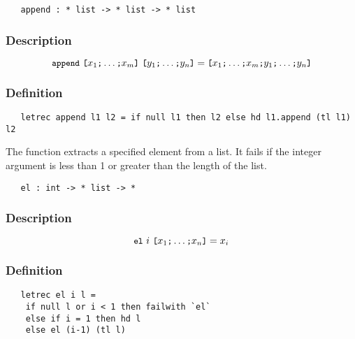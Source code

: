 \begin{boxed}
\begin{verbatim}
   append : * list -> * list -> * list
\end{verbatim}\end{boxed}

\subsubsection*{Description}

\[ \ml{append}\ \ml{[}x_1\ml{;}\ldots\ml{;}x_m\ml{]}\ 
\ml{[}y_1\ml{;}\ldots\ml{;}y_n\ml{]} =
\ml{[}x_1\ml{;}\ldots\ml{;}x_m\ml{;}y_1\ml{;}\ldots\ml{;}y_n\ml{]} \]

\subsubsection*{Definition}

\begin{hol}\begin{verbatim}
   letrec append l1 l2 = if null l1 then l2 else hd l1.append (tl l1) l2
\end{verbatim}\end{hol}


\noindent The function  extracts a specified element from a list. It
fails if the integer argument is less than 1 or greater than the length of the
list.

\begin{boxed}
\begin{verbatim}
   el : int -> * list -> *
\end{verbatim}\end{boxed}

\subsubsection*{Description}

\[ \ml{el}\ i\ \ml{[}x_1\ml{;}\ldots\ml{;}x_n\ml{]} = x_i \]

\subsubsection*{Definition}

\begin{hol}\begin{verbatim}
   letrec el i l =
    if null l or i < 1 then failwith `el`
    else if i = 1 then hd l
    else el (i-1) (tl l)
\end{verbatim}\end{hol}


